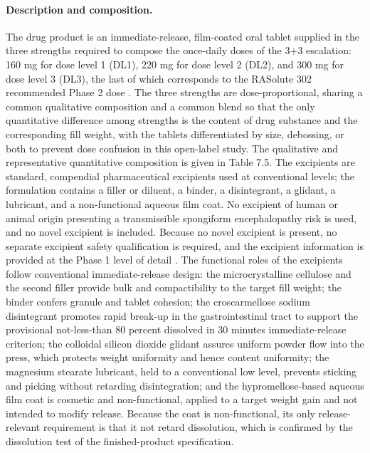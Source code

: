 \paragraph{Description and composition.}
The drug product is an immediate-release, film-coated oral tablet supplied in the
three strengths required to compose the once-daily doses of the 3+3 escalation:
160 mg for dose level 1 (DL1), 220 mg for dose level 2 (DL2), and 300 mg for
dose level 3 (DL3), the last of which corresponds to the RASolute 302 recommended
Phase 2 dose \cite{daraxwhipple,pdac060s2030}. The three strengths are
dose-proportional, sharing a common qualitative composition and a common blend so
that the only quantitative difference among strengths is the content of drug
substance and the corresponding fill weight, with the tablets differentiated by
size, debossing, or both to prevent dose confusion in this open-label study. The
qualitative and representative quantitative composition is given in Table 7.5. The
excipients are standard, compendial pharmaceutical excipients used at
conventional levels; the formulation contains a filler or diluent, a binder, a
disintegrant, a glidant, a lubricant, and a non-functional aqueous film coat. No
excipient of human or animal origin presenting a transmissible spongiform
encephalopathy risk is used, and no novel excipient is included. Because no novel
excipient is present, no separate excipient safety qualification is required, and
the excipient information is provided at the Phase 1 level of detail
\cite{phase1guidance}. The functional roles of the excipients follow conventional
immediate-release design: the microcrystalline cellulose and the second filler
provide bulk and compactibility to the target fill weight; the binder confers
granule and tablet cohesion; the croscarmellose sodium disintegrant promotes rapid
break-up in the gastrointestinal tract to support the provisional not-less-than 80
percent dissolved in 30 minutes immediate-release criterion; the colloidal silicon
dioxide glidant assures uniform powder flow into the press, which protects weight
uniformity and hence content uniformity; the magnesium stearate lubricant, held to
a conventional low level, prevents sticking and picking without retarding
disintegration; and the hypromellose-based aqueous film coat is cosmetic and
non-functional, applied to a target weight gain and not intended to modify release.
Because the coat is non-functional, its only release-relevant requirement is that
it not retard dissolution, which is confirmed by the dissolution test of the
finished-product specification.

